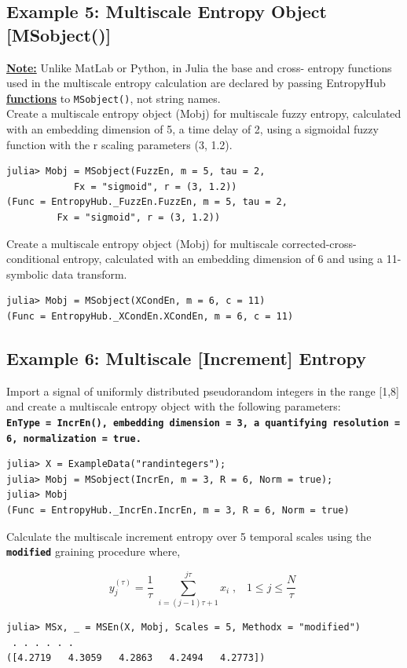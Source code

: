 \documentclass[12pt, a4paper, titlepage, openany]{book}
\begin{document}
\newpage
\subsection{\normalsize Example 5: \hspace{15mm} Multiscale Entropy Object [MSobject()]}

\noindent\textbf{\ul{Note:}} Unlike MatLab or Python,  in Julia the base and cross- entropy functions used in the multiscale entropy calculation are declared by passing EntropyHub \ul{\textbf{functions}} to \texttt{MSobject()}, not string names.\\

\noindent Create a multiscale entropy object (Mobj) for multiscale fuzzy entropy, calculated with an embedding dimension of 5, a time delay of 2, using a sigmoidal fuzzy function with the r scaling parameters (3, 1.2).
\begin{verbatim}
julia> Mobj = MSobject(FuzzEn, m = 5, tau = 2, 
			Fx = "sigmoid", r = (3, 1.2))
(Func = EntropyHub._FuzzEn.FuzzEn, m = 5, tau = 2,
		 Fx = "sigmoid", r = (3, 1.2))
\end{verbatim}
Create a multiscale entropy object (Mobj) for multiscale corrected-cross-conditional entropy, calculated with an embedding dimension of 6 and using a 11-symbolic data transform.
\begin{verbatim}
julia> Mobj = MSobject(XCondEn, m = 6, c = 11)
(Func = EntropyHub._XCondEn.XCondEn, m = 6, c = 11)
\end{verbatim}


\newpage
\subsection{\normalsize Example 6: \hspace{15mm} Multiscale [Increment] Entropy}
\noindent Import a signal of uniformly distributed pseudorandom integers in the range [1,8] and create a multiscale entropy object with the following parameters:\\
\textbf{\texttt{EnType =  IncrEn(), embedding dimension = 3, a quantifying resolution = 6, normalization = true.}}
\begin{verbatim}
julia> X = ExampleData("randintegers");
julia> Mobj = MSobject(IncrEn, m = 3, R = 6, Norm = true);
julia> Mobj
(Func = EntropyHub._IncrEn.IncrEn, m = 3, R = 6, Norm = true)
\end{verbatim}    
Calculate the multiscale increment entropy over 5 temporal scales using the \texttt{\textbf{modified}} graining procedure where,
\begin{par}
$$y_j^{\left(\tau \right)} =\frac{1}{\tau }\;\sum_{i=\left(j-1\right)\tau +1}^{j\tau } x_i \;,\;\;\;1\le j\le \frac{N}{\tau }\;$$
\end{par}
\begin{verbatim}
julia> MSx, _ = MSEn(X, Mobj, Scales = 5, Methodx = "modified")
 . . . . . .
([4.2719   4.3059   4.2863   4.2494   4.2773])
\end{verbatim}
\end{document}
